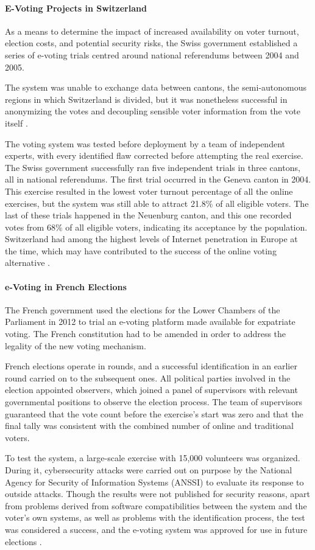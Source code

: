 \documentclass[../access.tex]{subfiles}
\begin{document}
    \paragraph{E-Voting Projects in Switzerland}
    As a means to determine the impact of increased availability on voter turnout, election costs, and potential security risks, the Swiss government established a series of e-voting trials centred around national referendums between 2004 and 2005.
    \par
    The system was unable to exchange data between cantons, the semi-autonomous regions in which Switzerland is divided, but it was nonetheless successful in anonymizing the votes and decoupling sensible voter information from the vote itself \cite{Binder2019}.
    \par
    The voting system was tested before deployment by a team of independent experts, with every identified flaw corrected before attempting the real exercise. The Swiss government successfully ran five independent trials in three cantons, all in national referendums. The first trial occurred in the Geneva canton in 2004. This exercise resulted in the lowest voter turnout percentage of all the online exercises, but the system was still able to attract 21.8\% of all eligible voters. The last of these trials happened in the Neuenburg canton, and this one recorded votes from 68\% of all eligible voters, indicating its acceptance by the population. Switzerland had among the highest levels of Internet penetration in Europe at the time, which may have contributed to the success of the online voting alternative \cite{Braun2006}.
    
    \paragraph{e-Voting in French Elections}
    The French government used the elections for the Lower Chambers of the Parliament in 2012 to trial an e-voting platform made available for expatriate voting. The French constitution had to be amended in order to address the legality of the new voting mechanism.
    \par
    French elections operate in rounds, and a successful identification in an earlier round carried on to the subsequent ones. All political parties involved in the election appointed observers, which joined a panel of supervisors with relevant governmental positions to observe the election process. The team of supervisors guaranteed that the vote count before the exercise's start was zero and that the final tally was consistent with the combined number of online and traditional voters.
    \par
    To test the system, a large-scale exercise with 15,000 volunteers was organized. During it, cybersecurity attacks were carried out on purpose by the National Agency for Security of Information Systems (ANSSI) to evaluate its response to outside attacks. Though the results were not published for security reasons, apart from problems derived from software compatibilities between the system and the voter's own systems, as well as problems with the identification process, the test was considered a success, and the e-voting system was approved for use in future elections \cite{Pinault2012}.
	
\end{document}
